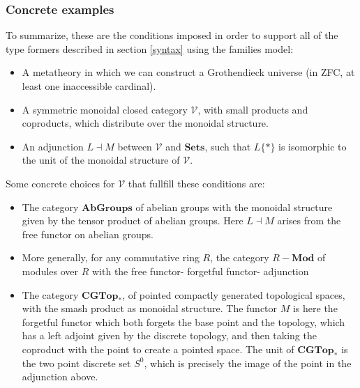 \subsubsection{Concrete examples}
To summarize, these are the conditions imposed in order  to support all of the type formers described in section \ref{syntax} using the families model:
\begin{itemize}
\item A metatheory in which we can construct a Grothendieck universe (in ZFC, at least one inaccessible cardinal).
\item A symmetric monoidal closed category $\mathcal{V}$, with small products and coproducts, which distribute over the monoidal structure.
\item An adjunction $L \dashv M$ between $\mathcal{V}$ and $\mathbf{Sets}$, such that $L\{*\}$ is isomorphic to the unit of the monoidal structure of $\mathcal{V}$.
\end{itemize}
Some concrete choices for $\mathcal{V}$ that fullfill these conditions are:
\begin{itemize}
\item The category $\mathbf{AbGroups}$ of abelian groups with the monoidal structure given by the tensor product of abelian groups. Here $L \dashv M$ arises from the free functor on abelian groups.
\item More generally, for any commutative ring $R$, the category $R-\mathbf{Mod}$ of modules over $R$ with the free functor- forgetful functor- adjunction
\item The category $\mathbf{CGTop}_*$, of pointed compactly generated topological spaces, with the smash product as monoidal structure. The functor $M$ is here the forgetful functor which both forgets the base point and the topology, which has a left adjoint given by the discrete topology, and then taking the coproduct with the point to create a pointed space. The unit of $\mathbf{CGTop}_*$ is the two point discrete set $S^0$, which is precisely the image of the point in the adjunction above.
\end{itemize}
